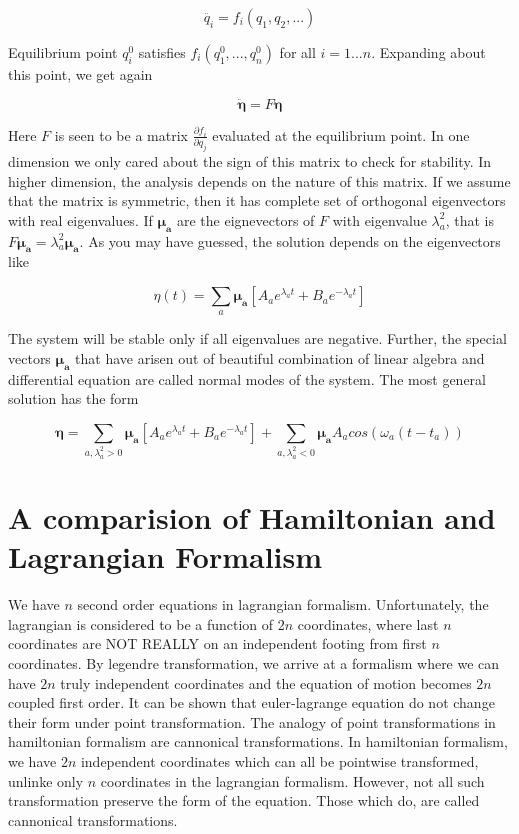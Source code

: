 \documentclass{report}
\begin{document}
$$\ddot{q_i} = f_i(q_1,q_2,...)$$

\noindent Equilibrium point $q_i^{0}$ satisfies $f_i(q_1^0,...,q_n^0)$ for all $i=1...n$. Expanding about this point, we get again

$$\boldsymbol{\ddot{\eta}} = F \boldsymbol{\eta}$$

\noindent Here $F$ is seen to be a matrix $\frac{\partial f_i}{\partial q_j}$ evaluated at the equilibrium point. In one dimension we only cared about the sign of this matrix to check for stability. In higher dimension, the analysis depends on the nature of this matrix. If we assume that the matrix is symmetric, then it has complete set of orthogonal eigenvectors with real eigenvalues. If $\boldsymbol{\mu_a}$ are the eignevectors of $F$ with eigenvalue $\lambda_a^2$, that is $F\boldsymbol{\mu_a}= \lambda_a^2\boldsymbol{\mu_a}$. As you may have guessed, the solution depends on the eigenvectors like

$$\eta(t) = \sum_{a}\boldsymbol{\mu_a}\left[A_ae^{\lambda_a t} + B_ae^{-\lambda_a t}\right]$$

\noindent The system will be stable only if all eigenvalues are negative. Further, the special vectors $\boldsymbol{\mu_a}$ that have arisen out of beautiful combination of linear algebra and differential equation are called normal modes of the system. The most general solution has the form

$$\boldsymbol{\eta} = \sum_{a,\lambda_a^2>0}\boldsymbol{\mu_a}\left[ A_ae^{\lambda_a t} + B_ae^{-\lambda_a t}\right] + \sum_{a,\lambda_a^2<0}\boldsymbol{\mu_a}A_a cos(\omega_a(t-t_a))$$

\section{A comparision of Hamiltonian and Lagrangian Formalism}

We have $n$ second order equations in lagrangian formalism. Unfortunately, the lagrangian is considered to be a function of $2n$ coordinates, where last $n$ coordinates are NOT REALLY on an independent footing from first $n$ coordinates. By legendre transformation, we arrive at a formalism where we can have $2n$ truly independent coordinates and the equation of motion becomes $2n$ coupled first order. It can be shown that euler-lagrange equation do not change their form under point transformation. The analogy of point transformations in hamiltonian formalism are cannonical transformations. In hamiltonian formalism, we have $2n$ independent coordinates which can all be pointwise transformed, unlinke only $n$ coordinates in the lagrangian formalism. However, not all such transformation preserve the form of the equation. Those which do, are called cannonical transformations.
\end{document}
